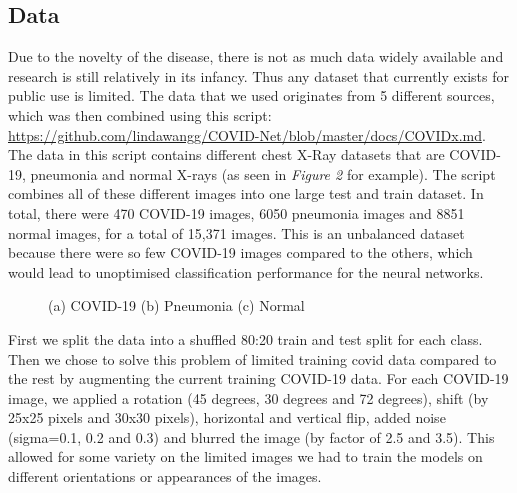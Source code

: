 \documentclass[conference,compsoc]{IEEEtran}
\begin{document}
\subsection{Data}
Due to the novelty of the disease, there is not as much data widely available and research is still relatively in its infancy. 
Thus any dataset that currently exists for public use is limited. The data that we used originates from 5 different sources, 
which was then combined using this script:
\href{https://github.com/lindawangg/COVID-Net/blob/master/docs/COVIDx.md}{https://github.com/lindawangg/COVID-Net/blob/master/docs/COVIDx.md}. The data in 
this script contains different chest X-Ray datasets that are COVID-19, pneumonia and normal X-rays (as seen in
\textit{Figure 2} for example). The script combines all of 
these different images into one large test and train dataset. In total, there were 470 COVID-19 images, 6050 pneumonia images and 
8851 normal images, for a total of 15,371 images. This is an unbalanced dataset because there were so few COVID-19 images compared to 
the others, which would lead to unoptimised classification performance for the neural networks. 

\begin{figure}
    \centering
    \caption{(a) COVID-19 (b) Pneumonia (c) Normal}
    \label{fig:fig2}
\end{figure}

First we split the data into a shuffled 80:20 train and test split for each class. Then we chose to solve this problem of 
limited training covid data compared to the rest by augmenting the current training COVID-19 data. For each COVID-19 image, 
we applied a rotation (45 degrees, 30 degrees and 72 degrees), shift (by 25x25 pixels and 30x30 pixels), horizontal and vertical flip, 
added noise (sigma=0.1, 0.2 and 0.3) and blurred the image (by factor of 2.5 and 3.5). This allowed for some variety on the 
limited images we had to train the models on different orientations or appearances of the images. 
\end{document}
